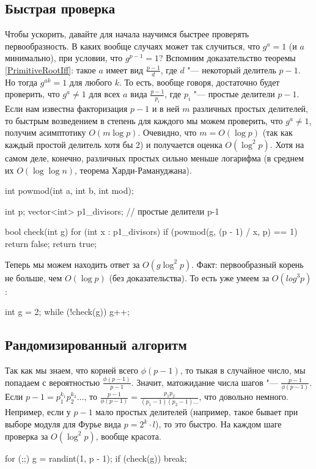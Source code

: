 \subsection{Быстрая проверка}
	Чтобы ускорить, давайте для начала научимся быстрее проверять первообразность.
	В каких вообще случаях может так случиться, что $g^a=1$ (и $a$ минимально), при условии, что $g^{p-1}=1$?
	Вспомним доказательство теоремы \ref{PrimitiveRootIff}: такое $a$ имеет вид $\frac{p-1}{d}$, где $d$ "--- некоторый делитель $p-1$.
	Но тогда $g^{ak}=1$ для любого $k$.
	То есть, вообще говоря, достаточно будет проверить, что $g^a \neq 1$ для всех $a$ вида $\frac{p - 1}{p_i}$, где $p_i$ "--- простые делители $p-1$.
	Если нам известна факторизация $p-1$ и в ней $m$ различных простых делителей, то быстрым возведением в степень для каждого мы можем проверить, что $g^a \neq 1$,
	получим асимптотику $O(m\log p)$.
	Очевидно, что $m = O(\log p)$ (так как каждый простой делитель хотя бы 2) и получается оценка $O(\log^2 p)$.
	Хотя на самом деле, конечно, различных простых сильно меньше логарифма (в среднем их $O(\log \log n)$, теорема Харди-Рамануджана).
\begin{cppcode}
int powmod(int a, int b, int mod);

int p;
vector<int> p1_divisors; // простые делители p-1

bool check(int g) {
    for (int x : p1_divisors) {
        if (powmod(g, (p - 1) / x, p) == 1) {
            return false;
        }
    }
    return true;
}
\end{cppcode}

	Теперь мы можем находить ответ за $O(g \log^2 p)$.
	Факт: первообразный корень не больше, чем $O(\log p)$ (без доказательства).
	То есть уже умеем за $O(log^3 p)$:
\begin{cppcode}
int g = 2;
while (!check(g)) g++;
\end{cppcode}

\subsection{Рандомизированный алгоритм}
	Так как мы знаем, что корней всего $\phi(p-1)$, то тыкая в случайное число, мы попадаем с вероятностью $\frac{\phi(p-1)}{p-1}$.
	Значит, матожидание числа шагов "--- $\frac{p - 1}{\phi(p-1)}$.
	Если $p-1=p_1^{k_1}p_2^{k_2}\dots$, то $\frac{p-1}{\phi(p-1)} = \frac{p_1p_2}{(p_1-1)(p_2-1)\dots}$, что довольно немного.
	Непример, если у $p-1$ мало простых делителей (например, такое бывает при выборе модуля для Фурье вида $p=2^k \cdot l$), то это быстро.
	На каждом шаге проверка за $O(\log^2 p)$, вообще красота.
\begin{cppcode}
for (;;) {
    g = randint(1, p - 1);
    if (check(g)) break;
}
\end{cppcode}

